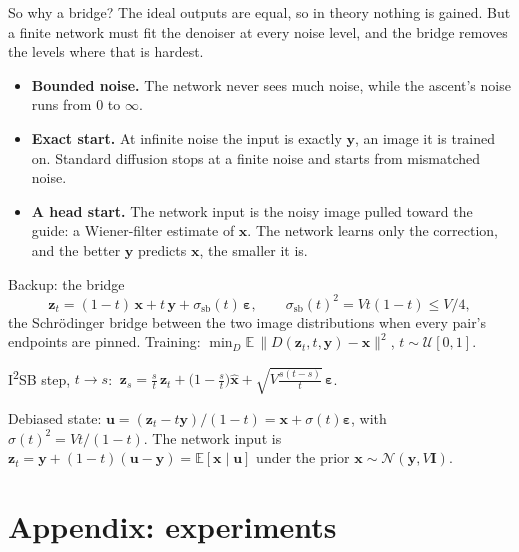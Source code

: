 \documentclass[aspectratio=169, 11pt]{beamer}
\newcommand{\x}{\bm{x}}
\newcommand{\y}{\bm{y}}
\newcommand{\z}{\bm{z}}
\newcommand{\uu}{\bm{u}}
\newcommand{\eps}{\bm{\varepsilon}}
\newcommand{\hx}{\hat{\bm{x}}}
\newcommand{\E}{\mathbb{E}}
\newcommand{\N}{\mathcal{N}}
\newcommand{\ssb}{\sigma_{\mathrm{sb}}}
\newcommand{\D}{D}
\begin{document}
\begin{frame}{So why a bridge?}
\small
The ideal outputs are equal, so in theory nothing is gained. But a finite network must fit the
denoiser at every noise level, and the bridge removes the levels where that is hardest.
\begin{itemize}
  \setlength{\itemsep}{4pt}
  \item \textbf{Bounded noise.} The network never sees much noise, while the ascent's noise runs
        from $0$ to $\infty$.
  \item \textbf{Exact start.} At infinite noise the input is exactly $\y$, an image it is
        trained on. Standard diffusion stops at a finite noise and starts from mismatched
        noise.
  \item \textbf{A head start.} The network input is the noisy image pulled toward the guide: a
        Wiener-filter estimate of $\x$. The network learns only the correction, and the better
        $\y$ predicts $\x$, the smaller it is.
\end{itemize}

\end{frame}

\begin{frame}{Backup: the bridge}
\small
\[
  \z_t = (1-t)\,\x + t\,\y + \ssb(t)\,\eps,\qquad \ssb(t)^2 = Vt(1-t)\le V/4,
\]
the Schr\"odinger bridge between the two image distributions when every pair's endpoints are
pinned. Training: $\min_\D \E\,\|\D(\z_t,t,\y)-\x\|^2$, $t\sim\mathcal U[0,1]$.

\medskip
I\textsuperscript{2}SB step, $t\to s$:
$\ \z_s = \tfrac st\,\z_t + \big(1-\tfrac st\big)\hx + \sqrt{V\tfrac{s(t-s)}{t}}\,\eps$.

\medskip
Debiased state: $\uu = (\z_t - t\y)/(1-t) = \x + \sigma(t)\eps$, with
$\sigma(t)^2 = Vt/(1-t)$. The network input is
$\z_t = \y + (1-t)(\uu-\y) = \E[\x\mid\uu]$ under the prior $\x\sim\N(\y,V\bm I)$.
\end{frame}

\section*{Appendix: experiments}
\end{document}
